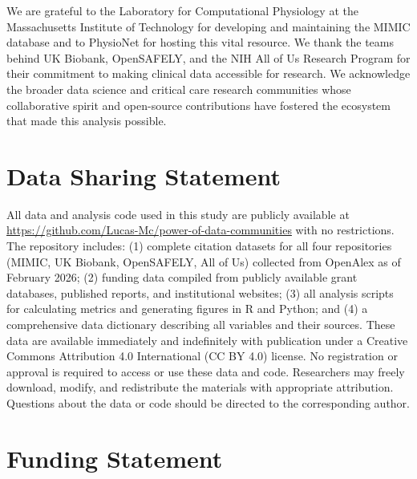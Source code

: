 \documentclass[11pt]{article}
\begin{document}
We are grateful to the Laboratory for Computational Physiology at the Massachusetts Institute of Technology for developing and maintaining the MIMIC database and to PhysioNet for hosting this vital resource. We thank the teams behind UK Biobank, OpenSAFELY, and the NIH All of Us Research Program for their commitment to making clinical data accessible for research. We acknowledge the broader data science and critical care research communities whose collaborative spirit and open-source contributions have fostered the ecosystem that made this analysis possible.

\section*{Data Sharing Statement}

All data and analysis code used in this study are publicly available at \url{https://github.com/Lucas-Mc/power-of-data-communities} with no restrictions. The repository includes: (1) complete citation datasets for all four repositories (MIMIC, UK Biobank, OpenSAFELY, All of Us) collected from OpenAlex as of February 2026; (2) funding data compiled from publicly available grant databases, published reports, and institutional websites; (3) all analysis scripts for calculating metrics and generating figures in R and Python; and (4) a comprehensive data dictionary describing all variables and their sources. These data are available immediately and indefinitely with publication under a Creative Commons Attribution 4.0 International (CC BY 4.0) license. No registration or approval is required to access or use these data and code. Researchers may freely download, modify, and redistribute the materials with appropriate attribution. Questions about the data or code should be directed to the corresponding author.

\section*{Funding Statement}
\end{document}
